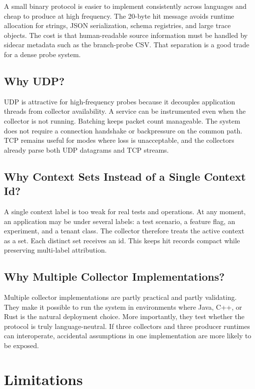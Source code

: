 \documentclass[11pt]{article}
\begin{document}
A small binary protocol is easier to implement consistently across languages
and cheap to produce at high frequency. The 20-byte hit message avoids runtime
allocation for strings, JSON serialization, schema registries, and large trace
objects. The cost is that human-readable source information must be handled by
sidecar metadata such as the branch-probe CSV. That separation is a good trade
for a dense probe system.

\subsection{Why UDP?}

UDP is attractive for high-frequency probes because it decouples application
threads from collector availability. A service can be instrumented even when
the collector is not running. Batching keeps packet count manageable. The
system does not require a connection handshake or backpressure on the common
path. TCP remains useful for modes where loss is unacceptable, and the
collectors already parse both UDP datagrams and TCP streams.

\subsection{Why Context Sets Instead of a Single Context Id?}

A single context label is too weak for real tests and operations. At any
moment, an application may be under several labels: a test scenario, a feature
flag, an experiment, and a tenant class. The collector therefore treats the
active context as a set. Each distinct set receives an id. This keeps hit
records compact while preserving multi-label attribution.

\subsection{Why Multiple Collector Implementations?}

Multiple collector implementations are partly practical and partly validating.
They make it possible to run the system in environments where Java, C++, or
Rust is the natural deployment choice. More importantly, they test whether the
protocol is truly language-neutral. If three collectors and three producer
runtimes can interoperate, accidental assumptions in one implementation are
more likely to be exposed.

\section{Limitations}
\end{document}
